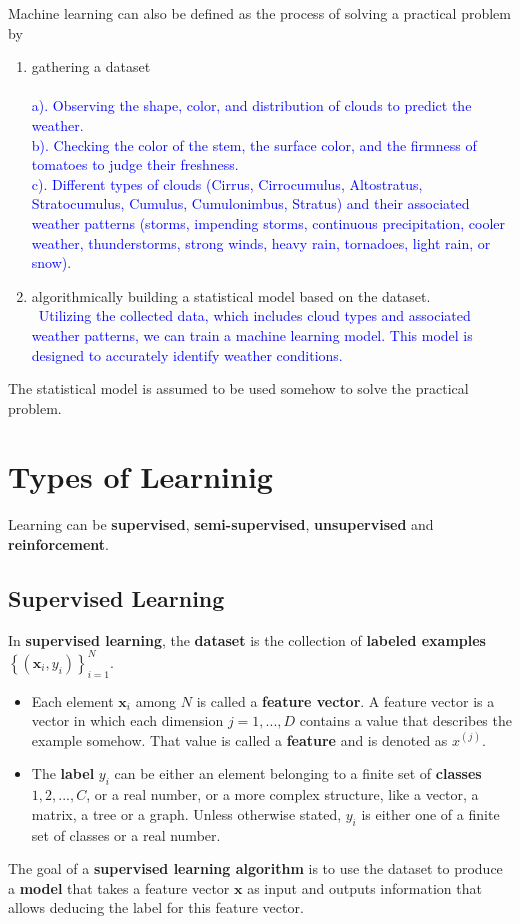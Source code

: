 Machine learning can also be defined as the process of solving a practical problem by
\begin{enumerate}
	\item gathering a dataset
 \\ \textcolor{blue}{
 \\a). Observing the shape, color, and distribution of clouds to predict the weather.
\\b). Checking the color of the stem, the surface color, and the firmness of tomatoes to judge their freshness.
\\c). Different types of clouds (Cirrus, Cirrocumulus, Altostratus, Stratocumulus, Cumulus, Cumulonimbus, Stratus) and their associated weather patterns (storms, impending storms, continuous precipitation, cooler weather, thunderstorms, strong winds, heavy rain, tornadoes, light rain, or snow).}
	\item algorithmically building a statistical model based on the dataset.
 \\~\textcolor{blue}{Utilizing the collected data, which includes cloud types and associated weather patterns, we can train a machine learning model. This model is designed to accurately identify weather conditions.}
\end{enumerate}
The statistical model is assumed to be used somehow to solve the practical problem.

\section{Types of Learninig}
Learning can be \textbf{supervised}, \textbf{semi-supervised}, \textbf{unsupervised} and \textbf{reinforcement}.
\subsection{Supervised Learning}
In \textbf{supervised learning}, the \textbf{dataset} is the collection of \textbf{labeled examples} $\left\{\left(\mathbf{x}_i, y_i\right)\right\}_{i=1}^N$.
\begin{itemize}
	\item Each element $\mathbf{x}_i$ among $N$ is called a \textbf{feature vector}. A feature vector is a vector in which each dimension $j=1,...,D$ contains a value that describes the example somehow. That value is called a \textbf{feature} and is denoted as \(x^{(j)}\).
	\item The \textbf{label} \(y_i\) can be either an element belonging to a finite set of \textbf{classes} ${1,2,...,C}$, or a real number, or a more complex structure, like a vector, a matrix, a tree or a graph. Unless otherwise stated, $y_i$ is either one of a finite set of classes or a real number.
\end{itemize}
The goal of a \textbf{supervised learning algorithm} is to use the dataset to produce a \textbf{model} that takes a feature vector $\mathbf{x}$ as input and outputs information that allows deducing the label for this feature vector.

